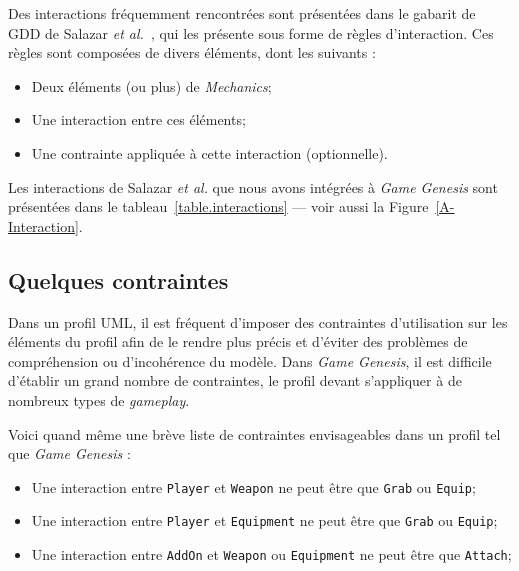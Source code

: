 Des interactions fréquemment rencontrées sont présentées dans le gabarit de GDD de Salazar \emph{et al.}~\cite{salazar_gdd}, qui les présente sous forme de règles d'interaction.
Ces règles sont composées de divers éléments, dont les suivants :
\begin{itemize}
    \item Deux \'el\'ements (ou plus) de \emph{Mechanics};
    \item Une interaction entre ces \'el\'ements;
    \item Une contrainte appliquée à cette interaction (optionnelle).
\end{itemize}
Les interactions de Salazar \emph{et al.} que nous avons intégrées à \emph{Game Genesis} sont présentées dans le tableau~\ref{table.interactions} --- voir aussi la Figure~\ref{A-Interaction}.




\subsection{Quelques contraintes}

Dans un profil UML, il est fréquent d'imposer des contraintes d'utilisation sur les \'el\'ements du profil afin de le rendre plus précis et d'éviter des problèmes de compréhension ou d'incohérence du modèle.
Dans \emph{Game Genesis}, il est difficile d'établir un grand nombre de contraintes, le profil devant s'appliquer à de nombreux types de \emph{gameplay}.

Voici quand m\^eme une br\`eve liste de contraintes envisageables dans un profil tel que \emph{Game Genesis} :
\begin{itemize}
    \item Une interaction entre \texttt{Player} et \texttt{Weapon} ne peut être que \texttt{Grab} ou \texttt{Equip};
    \item Une interaction entre \texttt{Player} et \texttt{Equipment} ne peut être que \texttt{Grab} ou \texttt{Equip};
    \item Une interaction entre \texttt{AddOn} et \texttt{Weapon} ou \texttt{Equipment} ne peut être que \texttt{Attach};
\end{itemize}

